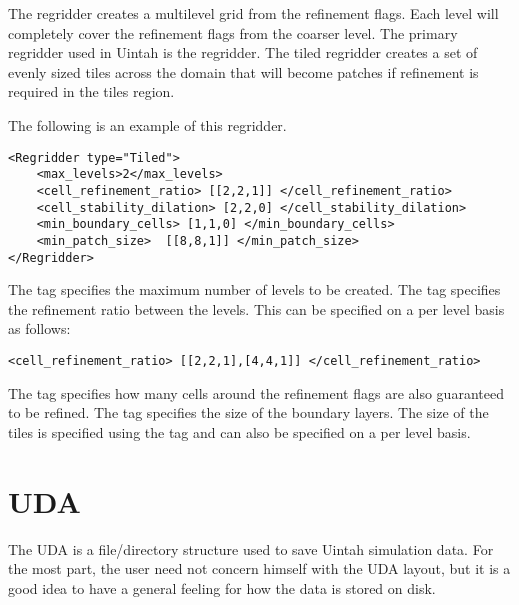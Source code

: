 The regridder creates a multilevel grid from the refinement flags.
Each level will completely cover the refinement flags from the coarser
level.  The primary regridder used in Uintah is the  regridder.
The tiled regridder creates a set of evenly sized tiles across the domain
that will become patches if refinement is required in the tiles region.

The following is an example of this regridder.

\begin{Verbatim}[fontsize=\footnotesize]
<Regridder type="Tiled">
    <max_levels>2</max_levels>
    <cell_refinement_ratio> [[2,2,1]] </cell_refinement_ratio>
    <cell_stability_dilation> [2,2,0] </cell_stability_dilation>
    <min_boundary_cells> [1,1,0] </min_boundary_cells>
    <min_patch_size>  [[8,8,1]] </min_patch_size>
</Regridder>
\end{Verbatim}

The  tag specifies the maximum number of levels
to be created.  The  tag specifies the
refinement ratio between the levels.  This can be specified on a per
level basis as follows:

\begin{Verbatim}[fontsize=\footnotesize]
    <cell_refinement_ratio> [[2,2,1],[4,4,1]] </cell_refinement_ratio>
\end{Verbatim}

The  tag specifies how many cells around
the refinement flags are also guaranteed to be refined.  The
 tag specifies the size of the boundary layers.
The size of the tiles is specified using the  tag
and can also be specified on a per level basis.

%


\section{UDA}


The UDA is a file/directory structure used to save Uintah simulation
data.  For the most part, the user need not concern himself with the
UDA layout, but it is a good idea to have a general feeling for how
the data is stored on disk.

